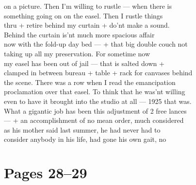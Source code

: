 \documentclass[11pt,a4paper]{article}
\begin{document}
{on a picture. Then I'm willing to rustle --- when there is \\
something going on on the easel. Then I rustle things \\
thru + retire behind my curtain + do'nt make a sound. \\
\quad Behind the curtain is'nt much more spacious affair \\
now with the fold-up day bed --- + that big double couch not \\
 taking up all my preservation. For sometime now \\
my easel has been out of jail --- that is salted down + \\
clamped in between bureau + table + rack for canvases behind \\
the scene. There was a row when I read the emancipation \\
proclamation over that easel. To think that he was'nt willing \\
even to have it brought into the studio at all --- 1925 that was. \\
\quad What a gigantic job has been this adjustment of 2 free lances \\
--- + an accomplishment of no mean order, much considered \\
as his mother said last summer, he had never had to \\
consider anybody in his life, had gone his own gait, no}






\section{Pages 28--29}
\end{document}
